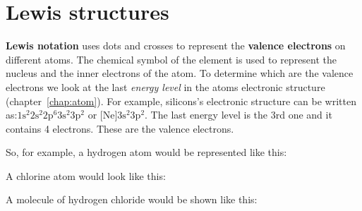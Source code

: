          \section{Lewis structures}
    \nopagebreak
      \label{m38701*id140105}\textbf{Lewis notation} uses dots and crosses to represent the \textbf{valence electrons} on different atoms. The chemical symbol of the element is used to represent the nucleus and the inner electrons of the atom. To determine which are the valence electrons we look at the last \textsl{energy level} in the atoms electronic structure (chapter~\ref{chap:atom}). For example, silicons's electronic structure can be written as:$1\text{s}^{2}2\text{s}^{2}2\text{p}^{6}3\text{s}^{2}3\text{p}^{2}$ or $\text{[Ne]}3\text{s}^{2}3\text{p}^{2}$. The last energy level is the 3rd one and it contains 4 electrons. These are the valence electrons.
 \par 
So, for example, a hydrogen atom would be represented like this: 

A chlorine atom would look like this:

A molecule of hydrogen chloride would be shown like this:
\begin{center}
\end{center}

